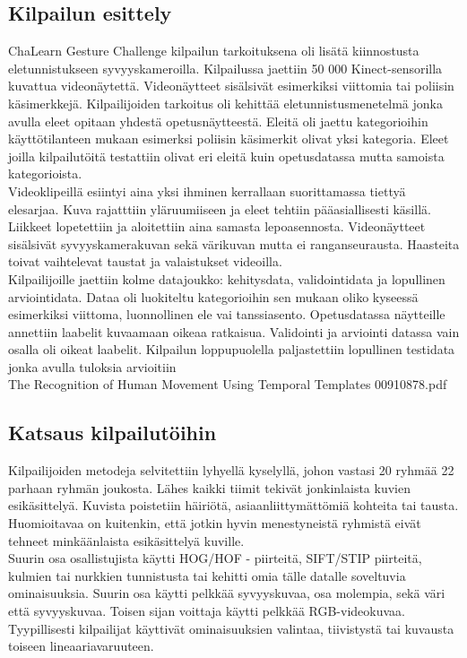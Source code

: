 \subsection{Kilpailun esittely}
ChaLearn Gesture Challenge kilpailun tarkoituksena oli lisätä kiinnostusta eletunnistukseen syvyyskameroilla.
Kilpailussa jaettiin 50 000 Kinect-sensorilla kuvattua videonäytettä. Videonäytteet sisälsivät esimerkiksi viittomia
tai poliisin käsimerkkejä. Kilpailijoiden tarkoitus oli kehittää eletunnistusmenetelmä jonka avulla eleet opitaan yhdestä opetusnäytteestä.
Eleitä oli jaettu kategorioihin käyttötilanteen mukaan esimerksi poliisin käsimerkit olivat yksi kategoria. Eleet joilla kilpailutöitä
testattiin olivat eri eleitä kuin opetusdatassa mutta samoista kategorioista.\\
Videoklipeillä esiintyi aina yksi ihminen kerrallaan suorittamassa tiettyä elesarjaa. Kuva rajatttiin yläruumiiseen ja eleet tehtiin
pääasiallisesti käsillä. Liikkeet lopetettiin ja aloitettiin aina samasta lepoasennosta. Videonäytteet sisälsivät syvyyskamerakuvan sekä värikuvan 
mutta ei ranganseurausta. Haasteita toivat vaihtelevat taustat ja valaistukset videoilla.\\
Kilpailijoille jaettiin kolme datajoukko: kehitysdata, validointidata ja lopullinen arviointidata. Dataa oli luokiteltu kategorioihin sen mukaan
oliko kyseessä esimerkiksi viittoma, luonnollinen ele vai tanssiasento. Opetusdatassa näytteille annettiin laabelit kuvaamaan oikeaa ratkaisua.
Validointi ja arviointi datassa vain osalla oli oikeat laabelit. Kilpailun loppupuolella paljastettiin lopullinen testidata jonka avulla tuloksia arvioitiin\\

The Recognition of Human Movement Using Temporal Templates
00910878.pdf


\subsection{Katsaus kilpailutöihin}
Kilpailijoiden metodeja selvitettiin lyhyellä kyselyllä, johon vastasi 20 ryhmää 22 parhaan ryhmän joukosta.
Lähes kaikki tiimit tekivät jonkinlaista kuvien esikäsittelyä. Kuvista poistetiin häiriötä, asiaanliittymättömiä kohteita tai tausta.
Huomioitavaa on kuitenkin, että jotkin hyvin menestyneistä ryhmistä eivät tehneet minkäänlaista esikäsittelyä kuville.\\

Suurin osa osallistujista käytti HOG/HOF - piirteitä, SIFT/STIP piirteitä, kulmien tai nurkkien tunnistusta tai kehitti omia tälle datalle soveltuvia ominaisuuksia.
Suurin osa käytti pelkkää syvyyskuvaa, osa molempia, sekä väri että syvyyskuvaa. Toisen sijan voittaja käytti pelkkää RGB-videokuvaa. 
Tyypillisesti kilpailijat käyttivät ominaisuuksien valintaa, tiivistystä tai kuvausta toiseen lineaariavaruuteen.\\

